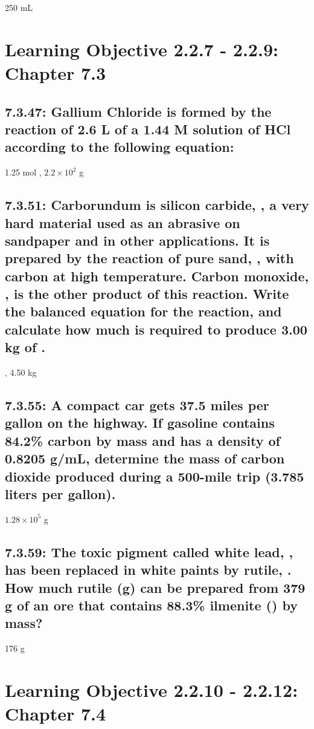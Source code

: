 \documentclass[11pt, letterpaper]{article}
\begin{document}
250 mL

\section*{Learning Objective 2.2.7 - 2.2.9: Chapter 7.3}

\subsection*{7.3.47: Gallium Chloride is formed by the reaction of 2.6 L 
of a 1.44 M solution of HCl according to the following equation: 
}

1.25 mol , $2.2 \times 10^{2}$ g 

\subsection*{7.3.51: Carborundum is silicon carbide, , a very hard material
used as an abrasive on sandpaper and in other applications.
It is prepared by the reaction of pure sand, ,
with carbon at high temperature. Carbon monoxide, ,
is the other product of this reaction.
Write the balanced equation for the reaction,
and calculate how much  is required to produce 3.00 kg of .}

, 4.50 kg 

\subsection*{7.3.55: A compact car gets 37.5 miles per gallon on the highway.
If gasoline contains 84.2\% carbon by mass and has a density of 0.8205 g/mL,
determine the mass of carbon dioxide produced during a
500-mile trip (3.785 liters per gallon).}

$1.28 \times 10^{5}$ g 

\subsection*{7.3.59: The toxic pigment called white lead, , 
has been replaced in white paints by rutile, . 
How much rutile (g) can be prepared from 379 g of an ore that contains 
88.3\% ilmenite () by mass?}

176 g 

\section*{Learning Objective 2.2.10 - 2.2.12: Chapter 7.4}
\end{document}
